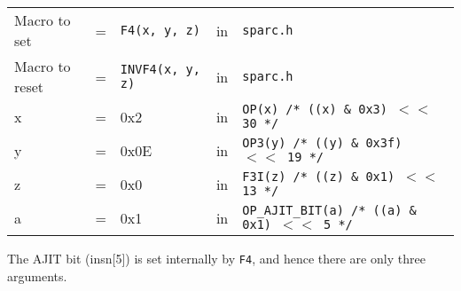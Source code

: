 \begin{enumerate}
  \begin{tabular}[h]{lclcl}
    Macro to set  &=& \texttt{F4(x, y, z)} &in& \texttt{sparc.h}     \\
    Macro to reset  &=& \texttt{INVF4(x, y, z)} &in& \texttt{sparc.h}     \\
    x &=& 0x2      &in& \texttt{OP(x)  /* ((x) \& 0x3)  $<<$ 30 */} \\
    y &=& 0x0E     &in& \texttt{OP3(y) /* ((y) \& 0x3f) $<<$ 19 */} \\
    z &=& 0x0      &in& \texttt{F3I(z) /* ((z) \& 0x1)  $<<$ 13 */} \\
    a &=& 0x1      &in& \texttt{OP\_AJIT\_BIT(a) /* ((a) \& 0x1)  $<<$ 5 */}
  \end{tabular}

  The AJIT bit  (insn[5]) is set internally by  \texttt{F4}, and hence
  there are only three arguments.


\end{enumerate}
